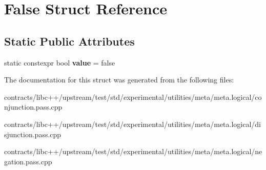 \hypertarget{struct_false}{}\section{False Struct Reference}
\label{struct_false}
\subsection*{Static Public Attributes}
\begin{DoxyCompactItemize}
\item 
\mbox{\label{struct_false_a03deac697b24d06b3ad95399f5167e90}} 
static constexpr bool {\bfseries value} = false
\end{DoxyCompactItemize}


The documentation for this struct was generated from the following files\+:\begin{DoxyCompactItemize}
\item 
contracts/libc++/upstream/test/std/experimental/utilities/meta/meta.\+logical/conjunction.\+pass.\+cpp\item 
contracts/libc++/upstream/test/std/experimental/utilities/meta/meta.\+logical/disjunction.\+pass.\+cpp\item 
contracts/libc++/upstream/test/std/experimental/utilities/meta/meta.\+logical/negation.\+pass.\+cpp\end{DoxyCompactItemize}
